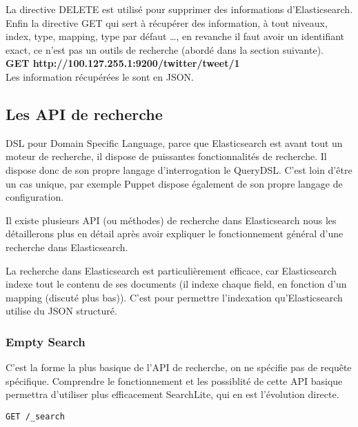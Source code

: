 La directive DELETE est utilisé pour supprimer des informations d'Elasticsearch.\\


Enfin la directive GET qui sert à récupérer des information, à tout niveaux, index,
type, mapping, type par défaut \ldots, en revanche il faut avoir un identifiant exact,
ce n'est pas un outils de recherche (abordé dans la section suivante).\\[5mm]
\textbf{GET  {\color{grey} http://100.127.255.1:9200}/{\color{red}twitter}/{\color{cyan}tweet}/{\color{yellow}1}}\\

Les information récupérées le sont en JSON.

\subsection{Les API de recherche}
DSL pour Domain Specific Language, parce que Elasticsearch est avant tout un moteur 
de recherche, il dispose de puissantes fonctionnalités de recherche. Il dispose donc
de son propre langage d'interrogation le QueryDSL. C'est loin d'être un cas unique,
par exemple Puppet dispose également de son propre langage de configuration.

Il existe plusieurs API (ou méthodes) de recherche dans Elasticsearch nous les  
détaillerons plus en détail après avoir expliquer le fonctionnement général d'une
recherche dans Elasticsearch.

La recherche dans Elasticsearch est particulièrement efficace, car Elasticsearch 
indexe tout le contenu de ses documents (il indexe chaque field, en fonction d'un
mapping (discuté plus bas)).
C'est pour permettre l'indexation qu'Elasticsearch utilise du JSON structuré.



\subsubsection{Empty Search}
C'est la forme la plus basique de l'API de recherche, on ne spécifie pas de requête
spécifique. Comprendre le fonctionnement et les possiblité de cette API basique 
permettra d'utiliser plus efficacement SearchLite, qui en est l'évolution directe.


\begin{lstlisting}[style=code,label={lst:APIsearchemptyexample1},caption={le "Hello World" de la recherche}]
GET /_search
\end{lstlisting}

